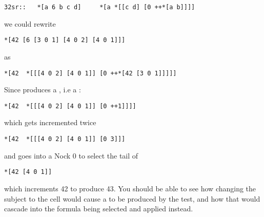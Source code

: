 \begin{framed_shaded}
\begin{Verbatim}[fontsize=\relsize{-2.5},commandchars=\\\{\}]
32sr::   *[a 6 b c d]     *[a *[[c d] [0 ++*[a b]]]]
\end{Verbatim}
\end{framed_shaded}
we could rewrite

\begin{framed_shaded}
\begin{Verbatim}[fontsize=\relsize{-2.5},commandchars=\\\{\}]
*[42 [6 [3 0 1] [4 0 2] [4 0 1]]]
\end{Verbatim}
\end{framed_shaded}
as

\begin{framed_shaded}
\begin{Verbatim}[fontsize=\relsize{-2.5},commandchars=\\\{\}]
*[42  *[[[4 0 2] [4 0 1]] [0 ++*[42 [3 0 1]]]]]
\end{Verbatim}
\end{framed_shaded}
Since \kode{*[42 [3 0 1]]} produces a , i.e a :

\begin{framed_shaded}
\begin{Verbatim}[fontsize=\relsize{-2.5},commandchars=\\\{\}]
*[42  *[[[4 0 2] [4 0 1]] [0 ++1]]]]
\end{Verbatim}
\end{framed_shaded}
which gets incremented twice
\begin{framed_shaded}
\begin{Verbatim}[fontsize=\relsize{-2.5},commandchars=\\\{\}]
*[42  *[[[4 0 2] [4 0 1]] [0 3]]]
\end{Verbatim}
\end{framed_shaded}
and goes into a Nock 0 to select the tail of \kode{[[4 0 2] [4 0 1]]}

\begin{framed_shaded}
\begin{Verbatim}[fontsize=\relsize{-2.5},commandchars=\\\{\}]
*[42 [4 0 1]]
\end{Verbatim}
\end{framed_shaded}
which increments 42 to produce 43. You should be able to see how changing the subject to the cell \kode{[40 43]} would cause a  to be produced by the test, and how that would cascade into the  formula \kode{[4 0 2]} being selected and applied instead.


